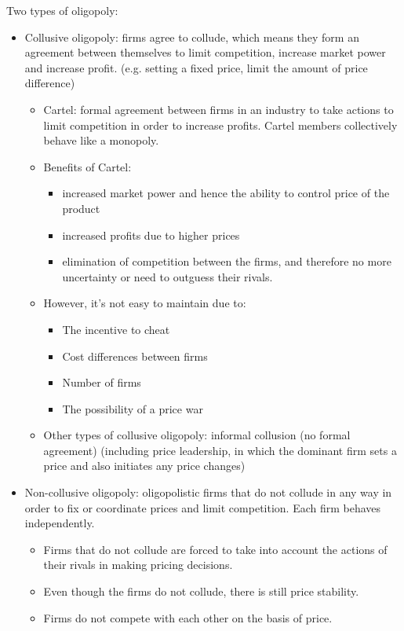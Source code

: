Two types of oligopoly:
\begin{itemize}
  \item Collusive oligopoly: firms agree to collude, which means they form an agreement between themselves to limit competition, increase market power and increase profit. (e.g. setting a fixed price, limit the amount of price difference)
  \begin{itemize}
    \item Cartel: formal agreement between firms in an industry to take actions to limit competition in order to increase profits. Cartel members collectively behave like a monopoly.
    \item Benefits of Cartel:
    \begin{itemize}
      \item increased market power and hence the ability to control price of the product
      \item increased profits due to higher prices
      \item elimination of competition between the firms, and therefore no more uncertainty or need to outguess their rivals.
    \end{itemize}
    \item However, it's not easy to maintain due to:
    \begin{itemize}
      \item The incentive to cheat
      \item Cost differences between firms
      \item Number of firms
      \item The possibility of a price war
    \end{itemize}
    \item Other types of collusive oligopoly: informal collusion (no formal agreement) (including price leadership, in which the dominant firm sets a price and also initiates any price changes)
  \end{itemize}
  \item Non-collusive oligopoly: oligopolistic firms that do not collude in any way in order to fix or coordinate prices and limit competition. Each firm behaves independently.
  \begin{itemize}
    \item Firms that do not collude are forced to take into account the actions of their rivals in making pricing decisions.
    \item Even though the firms do not collude, there is still price stability.
    \item Firms do not compete with each other on the basis of price.
  \end{itemize}
\end{itemize}
